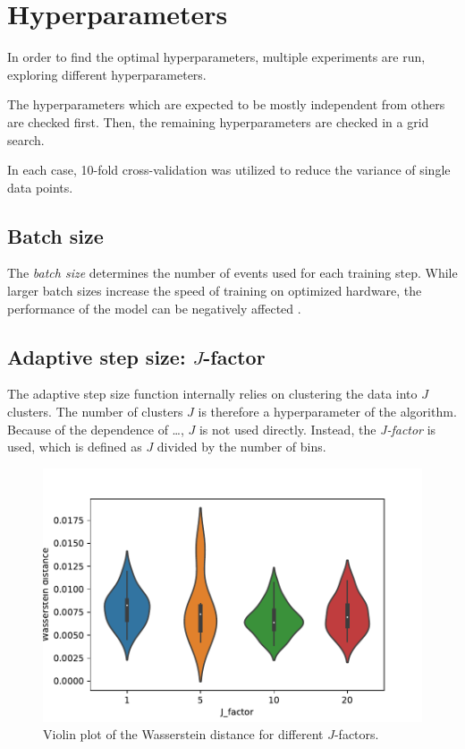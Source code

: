 \section{Hyperparameters}
In order to find the optimal hyperparameters,
multiple experiments are run,
exploring different hyperparameters.

The hyperparameters which are expected to be mostly independent from others are checked first.
Then, the remaining hyperparameters are checked in a grid search. %

In each case, 10-fold cross-validation was utilized to reduce the variance of single data points.


\subsection{Batch size}
The \emph{batch size} determines the number of events used for each training step.
While larger batch sizes increase the speed of training
on optimized hardware,
the performance of the model can be negatively affected \cite{batchsize_kandel}.



\subsection{Adaptive step size: $J$-factor}
The adaptive step size function internally relies on clustering the data into $J$ clusters.
The number of clusters $J$ is therefore a hyperparameter of the algorithm.
Because of the dependence of …,
$J$ is not used directly.
Instead, the \emph{J-factor} is used,
which is defined as $J$ divided by the number of bins.

\begin{figure}
  \centering
  \includegraphics[scale=1]{content/plots/halftime/wd_per_J_factor.pdf}
  \caption{Violin plot of the Wasserstein distance for different $J$-factors.}
  \label{fig:hyperparameter:J_factor}
\end{figure}



